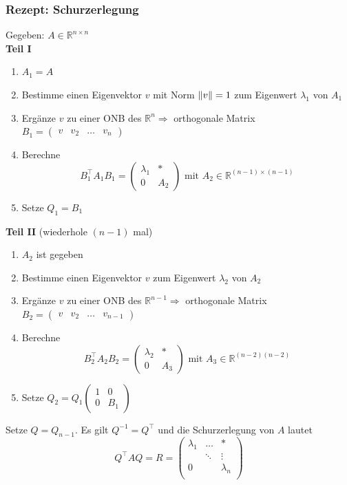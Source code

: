 \documentclass[6pt,a4paper]{scrartcl}
\newcommand{\norm}[2][\relax]{\ifx#1\relax \ensuremath{\left\Vert#2\right\Vert}\else \ensuremath{\left\Vert#2\right\Vert_{#1}}\fi}
\begin{document}
\begin{multicols*}{4}
\subsubsection{Rezept: Schurzerlegung}
Gegeben: $A\in \mathbb{R}^{n\times n}$ \\
\textbf{Teil I}
\begin{enumerate}\itemsep0pt
\item $A_1=A$
\item Bestimme einen Eigenvektor $v$ mit Norm $\norm v=1$ zum Eigenwert $\lambda_1$ von $A_1$
\item Ergänze $v$ zu einer ONB des $\mathbb{R}^n \Rightarrow$ orthogonale Matrix $B_1=\begin{pmatrix}
v & v_2 & \dots & v_n
\end{pmatrix}$
\item Berechne
\begin{equation*}
B_1^\top A_1 B_1=\begin{pmatrix}
\lambda_1 & \ast\\
0 & A_2
\end{pmatrix} 
\text{ mit } A_2\in \mathbb{R}^{(n-1)\times(n-1)}
\end{equation*}
\item Setze $Q_1=B_1$
\end{enumerate}
\textbf{Teil II} (wiederhole $(n-1)$ mal)
\begin{enumerate}\itemsep0pt
\item $A_2$ ist gegeben
\item Bestimme einen Eigenvektor $v$ zum Eigenwert $\lambda_2$ von $A_2$
\item Ergänze $v$ zu einer ONB des $\mathbb{R}^{n-1} \Rightarrow$ orthogonale Matrix $B_2=\begin{pmatrix}
v & v_2 & \dots & v_{n-1}
\end{pmatrix}$
\item Berechne
\begin{equation*}
B_2^\top A_2 B_2=\begin{pmatrix}
\lambda_2 & \ast\\
0 & A_3
\end{pmatrix} 
\text{ mit } A_3\in \mathbb{R}^{(n-2)(n-2)}
\end{equation*}
\item Setze $Q_2=Q_1\begin{pmatrix}
1 & 0\\
0 & B_1
\end{pmatrix}$
\end{enumerate}
Setze $Q=Q_{n-1}$. Es gilt $Q^{-1}=Q^\top$ und die Schurzerlegung von $A$ lautet
\begin{equation*}
Q^\top AQ=R=\begin{pmatrix}
\lambda_1 & \dots & \ast \\
 & \ddots & \vdots \\
0 &  & \lambda_n \\
\end{pmatrix}
\end{equation*}

\end{multicols*}
\end{document}
